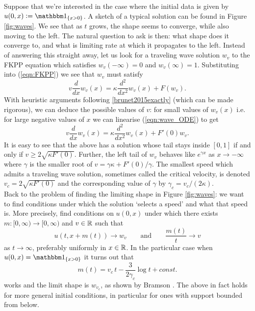 Suppose that we're interested in the case where the initial data is given by $u(0, x) \defeq \Ind_{\{ x > 0\}}$. A sketch of a typical solution can be found in Figure \ref{fig:waves}. We see that as $t$ grows, the shape seems to converge, while also moving to the left. The natural question to ask is then: what shape does it converge to, and what is limiting rate at which it propagates to the left. Instead of answering this straight away, let us look for a traveling wave solution $w_v$ to the FKPP equation which satisfies $w_v(-\infty) = 0$ and $w_v(\infty) = 1$. Substituting into (\ref{eqn:FKPP}) we see that $w_v$ must satisfy
\begin{equation}\label{eqn:wave_ODE}
v \frac{d}{dx}w_v(x) = \kappa \frac{d^2}{dx^2} w_v (x) + F(w_v). 
\end{equation}
With heuristic arguments following \ref{brunet2015exactly} (which can be made rigorous), we can deduce the possible values of $v$: for small values of $w_v(x)$ i.e. for large negative values of $x$ we can linearise (\ref{eqn:wave_ODE}) to get
\begin{equation}\nonumber
v \frac{d}{dx}w_v(x) = \kappa \frac{d^2}{dx^2}w_v(x) + F'(0) w_v. 
\end{equation}
It is easy to see that the above has a solution whose tail stays inside $[0,1]$ if and only if $v \geq 2 \sqrt{\kappa F'(0)}$. Further, the left tail of $w_v$ behaves like $e^{\gamma x}$ as $x \to -\infty$ where $\gamma$ is the smaller root of $v = \gamma \kappa + F'(0) / \gamma$. The smallest speed which admits a traveling wave solution, sometimes called the critical velocity, is denoted $v_c = 2 \sqrt{\kappa F'(0)}$ and the corresponding value of $\gamma$ by $\gamma_c = v_c / (2 \kappa)$. \\

Back to the problem of finding the limiting shape in Figure \ref{fig:waves}: we want to find conditions under which the solution `selects a speed' and what that speed is. More precisely, find conditions on $u(0, x)$ under which there exists $m : [0, \infty) \to [0, \infty)$ and $v \in \mathbb{R}$ such that
\begin{equation}\nonumber
u(t, x + m(t)) \to w_v \qquad\text{and}\qquad \frac{m(t)}{t} \to v
\end{equation} 
as $t \to \infty$, preferably uniformly in $x \in \mathbb{R}$. In the particular case when $u(0, x) = \Ind_{\{ x > 0\}}$ it turns out that 
\begin{equation}\nonumber
m(t) = v_c\,t - \frac{3}{2 \gamma_c} \log t + const. 
\end{equation}
works and the limit shape is $w_{v_c}$, as shown by Bramson \cite{bramson1978maximal}. The above in fact holds for more general initial conditions, in particular for ones with support bounded from below. \\

